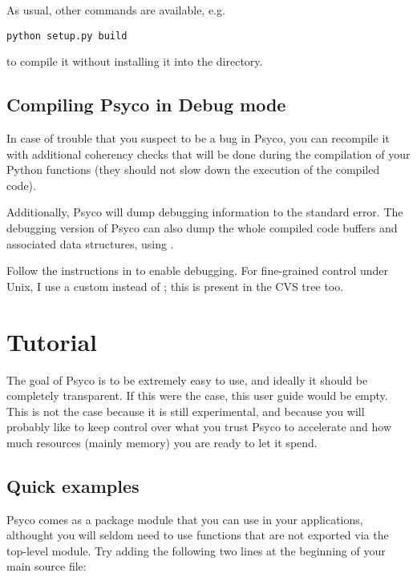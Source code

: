 \documentclass{manual}
\begin{document}
As usual, other commands are available, e.g.\ 

\begin{verbatim}
python setup.py build
\end{verbatim}

to compile it without installing it into the  directory.


\section{Compiling Psyco in Debug mode}\label{debugpsyco}

In case of trouble that you suspect to be a bug in Psyco, you can recompile it with additional coherency checks that will be done during the compilation of your Python functions (they should not slow down the execution of the compiled code).

Additionally, Psyco will dump debugging information to the standard error.  The debugging version of Psyco can also dump the whole compiled code buffers and associated data structures, using .

Follow the instructions in  to enable debugging.  For fine-grained control under Unix, I use a custom  instead of ; this  is present in the CVS tree too.



\chapter{Tutorial}

The goal of Psyco is to be extremely easy to use, and ideally it should be completely transparent.  If this were the case, this user guide would be empty.  This is not the case because it is still experimental, and because you will probably like to keep control over what you trust Psyco to accelerate and how much resources (mainly memory) you are ready to let it spend.


\section{Quick examples}

Psyco comes as a package module that you can use in your applications, althought you will seldom need to use functions that are not exported via the top-level  module.  Try adding the following two lines at the beginning of your main  source file:
\end{document}
